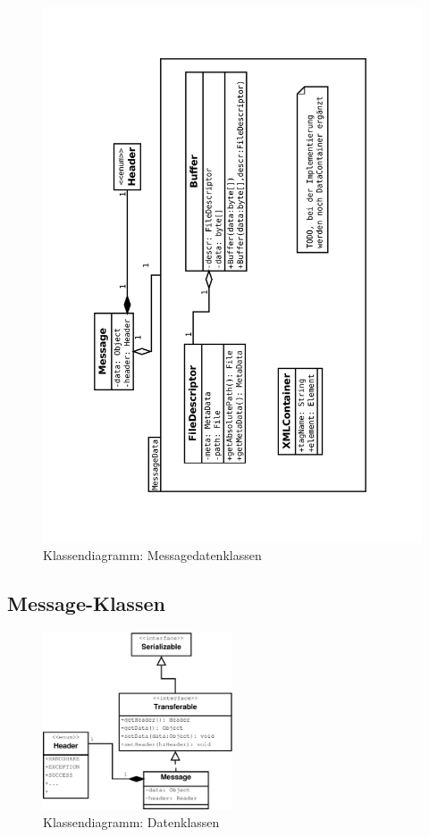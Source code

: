 \begin{figure}[H]
	\centering
	\label{dia:design:frontend:classes:datcl}
	\includegraphics[angle=270, width=.8\textwidth]{design/frontend/classes/MessageDaten-Klassen.pdf}
	\caption{Klassendiagramm: Messagedatenklassen}
\end{figure}

\subsection{Message-Klassen}
\liable{\eddy}

\begin{figure}[H]
	\centering
	\label{dia:design:frontend:classes:msgcl}
	\includegraphics[width=0.5\textwidth]{design/frontend/classes/Message-Klassen.pdf}
	\caption{Klassendiagramm: Datenklassen}
\end{figure}

